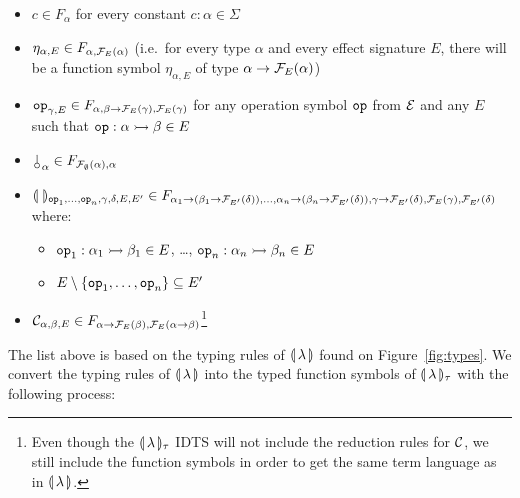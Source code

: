 \begin{itemize}
\item $c \in F_{\alpha}$ for every constant $c : \alpha \in \Sigma$
\item $\eta_{\alpha, E} \in F_{\alpha, \mathcal{F}_E(\alpha)}$ (i.e.\ for every
  type $\alpha$ and every effect signature $E$, there will be a function
  symbol $\eta_{\alpha,E}$ of type $\alpha \to \mathcal{F}_E(\alpha)$)
\item $\mathtt{op}_{\gamma, E} \in F_{\alpha, \beta \to \mathcal{F}_E(\gamma),
  \mathcal{F}_E(\gamma)}$ for any operation symbol $\mathtt{op}$ from $\mathcal{E}$ and any $E$
  such that $\mathtt{op} : \alpha \rightarrowtail \beta \in E$
\item $\cherry_\alpha \in F_{\FF_\emptyset(\alpha), \alpha}$
\item $\llparenthesis \,  \, \rrparenthesis_{\mathtt{op}_1, \ldots, \mathtt{op}_n, \gamma, \delta, E, E'} \in F_{\alpha_1 \to (\beta_1 \to \mathcal{F}_{E'}(\delta)), \ldots,
  \alpha_n \to (\beta_n \to \mathcal{F}_{E'}(\delta)), \gamma \to \mathcal{F}_{E'}(\delta),
  \mathcal{F}_E(\gamma), \mathcal{F}_{E'}(\delta)}$ where:
  \begin{itemize}
  \item $\mathtt{op}_1 : \alpha_1 \rightarrowtail \beta_1 \in E$, \ldots,
    $\mathtt{op}_n : \alpha_n \rightarrowtail \beta_n \in E$
  \item $E \setminus \{\mathtt{op}_1, \ldots, \mathtt{op}_n\} \subseteq E'$
  \end{itemize}
\item
  $\mathcal{C}_{\alpha,\beta,E} \in F_{\alpha \to \mathcal{F}_E(\beta),\mathcal{F}_E(\alpha \to
    \beta)}$\footnote{Even though the ${\llparenthesis \, \lambda \, \rrparenthesis_\tau}$ IDTS will not include the
    reduction rules for $\mathcal{C}$, we still include the function symbols in
    order to get the same term language as in ${\llparenthesis \, \lambda \, \rrparenthesis}$.}
\end{itemize}

The list above is based on the typing rules of $\llparenthesis \, \lambda \, \rrparenthesis$ found on
Figure~\ref{fig:types}. We convert the typing rules of $\llparenthesis \, \lambda \, \rrparenthesis$
into the typed function symbols of $\llparenthesis \, \lambda \, \rrparenthesis_\tau$ with the
following process:

